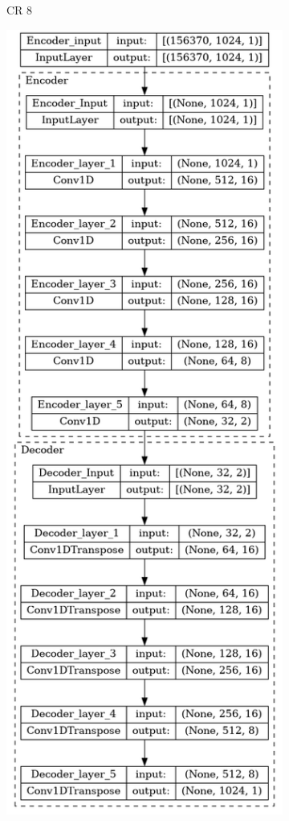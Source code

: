 \begin{appendices}
\begin{figure}
\begin{subfigure}{.5\textwidth}
			\caption{CR 8}
		\end{subfigure}
		\begin{subfigure}{.5\textwidth}
			\includegraphics[width=\linewidth,height=\textheight]{../../Images/CR_16.png}

\end{subfigure}
\end{figure}
\end{appendices}
